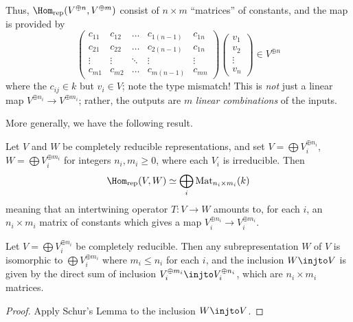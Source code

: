Thus, $\Homrep(V^{\oplus n}, V^{\oplus m})$ consist of $n \times m$ ``matrices''
of constants, and the map is provided by
\[
	\begin{pmatrix}
		c_{11} & c_{12} & \dots & c_{1(n-1)} & c_{1n} \\
		c_{21} & c_{22} & \dots & c_{2(n-1)} & c_{1n} \\
		\vdots & \vdots & \ddots & \vdots & \vdots \\
		c_{m1} & c_{m2} & \dots & c_{m(n-1)} & c_{mn}
	\end{pmatrix}
	\begin{pmatrix} v_1 \\ v_2 \\ \vdots \\ v_n \end{pmatrix}
	\in V^{\oplus n}
\]
where the $c_{ij} \in k$ but $v_i \in V$; note the type mismatch!
This is \emph{not} just a linear map $V^{\oplus n_i} \to V^{\oplus m_i}$;
rather, the outputs are $m$ \emph{linear combinations} of the inputs.

More generally, we have the following result.
\begin{theorem}
	\label{thm:compred_schur}
	Let $V$ and $W$ be completely reducible representations,
	and set $V = \bigoplus V_i^{\oplus n_i}$, $W = \bigoplus V_i^{\oplus m_i}$
	for integers $n_i, m_i \ge 0$, where each $V_i$ is irreducible.
	Then
	\[ \Homrep(V, W)
		\simeq \bigoplus_i \Mat_{n_i \times m_i}(k) \]
	meaning that an intertwining operator $T : V \to W$
	amounts to, for each $i$, an $n_i \times m_i$ matrix of constants
	which gives a map $V_i^{\oplus n_i} \to V_i^{\oplus m_i}$.
\end{theorem}

\begin{corollary}
	\label{cor:subrep_schur}
	Let $V = \bigoplus V_i^{\oplus n_i}$ be completely reducible.
	Then any subrepresentation $W$ of $V$ is isomorphic
	to $\bigoplus V_i^{\oplus m_i}$ where $m_i \le n_i$ for each $i$,
	and the inclusion $W \injto V$ is given
	by the direct sum of inclusion $V_i^{\oplus m_i} \injto V_i^{\oplus n_i}$,
	which are $n_i \times m_i$ matrices.
\end{corollary}
\begin{proof}
	Apply Schur's Lemma to the inclusion $W \injto V$.
\end{proof}



